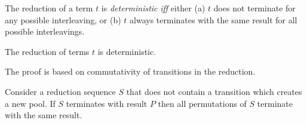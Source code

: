 \begin{definition}[Determinism]
The reduction of a term $t$ is \emph{deterministic} \emph{iff} either (a) $t$ does not terminate for any possible interleaving, or (b) $t$ always terminates with the same result for all possible interleavings.
\end{definition}

\begin{theorem}[Determinism]
The reduction of terms $t$ is deterministic.
\end{theorem}

The proof is based on commutativity of transitions in the reduction.

\begin{lemma}
Consider a reduction sequence $S$ that does not contain a transition which creates a new pool.
If $S$ terminates with result $P$ then all permutations of $S$ terminate with the same result.
\end{lemma}
